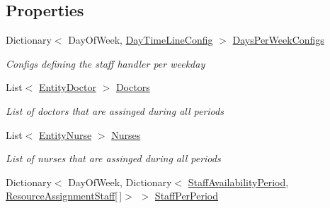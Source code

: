 \subsection*{Properties}
\begin{DoxyCompactItemize}
\item 
Dictionary$<$ Day\+Of\+Week, \hyperlink{class_general_health_care_elements_1_1_staff_handling_1_1_day_time_line_config}{Day\+Time\+Line\+Config} $>$ \hyperlink{class_general_health_care_elements_1_1_staff_handling_1_1_staff_per_period_handler_ac94366c624e3b094edaa66c35f7d8a65}{Days\+Per\+Week\+Configs}
\begin{DoxyCompactList}\small\item\em Configs defining the staff handler per weekday \end{DoxyCompactList}\item 
List$<$ \hyperlink{class_general_health_care_elements_1_1_entities_1_1_entity_doctor}{Entity\+Doctor} $>$ \hyperlink{class_general_health_care_elements_1_1_staff_handling_1_1_staff_per_period_handler_ac0a52f1fe17fbbedaa8bc2ec383bc858}{Doctors}
\begin{DoxyCompactList}\small\item\em List of doctors that are assinged during all periods \end{DoxyCompactList}\item 
List$<$ \hyperlink{class_general_health_care_elements_1_1_entities_1_1_entity_nurse}{Entity\+Nurse} $>$ \hyperlink{class_general_health_care_elements_1_1_staff_handling_1_1_staff_per_period_handler_a5831e4dde01957b4c474a4416b945b96}{Nurses}
\begin{DoxyCompactList}\small\item\em List of nurses that are assinged during all periods \end{DoxyCompactList}\item 
Dictionary$<$ Day\+Of\+Week, Dictionary$<$ \hyperlink{class_general_health_care_elements_1_1_staff_handling_1_1_staff_availability_period}{Staff\+Availability\+Period}, \hyperlink{class_general_health_care_elements_1_1_resource_handling_1_1_resource_assignment_staff}{Resource\+Assignment\+Staff}\mbox{[}$\,$\mbox{]}$>$ $>$ \hyperlink{class_general_health_care_elements_1_1_staff_handling_1_1_staff_per_period_handler_a1e182d4bee555f86e6ca8e35ab6bc285}{Staff\+Per\+Period}

\end{DoxyCompactItemize}
